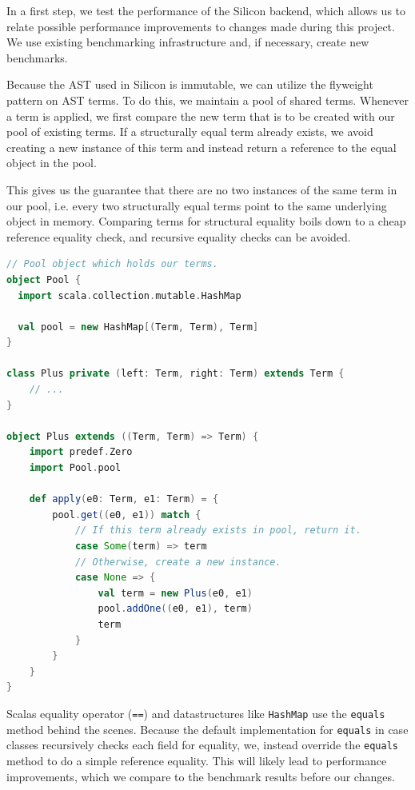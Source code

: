 \documentclass[11pt]{article}
\begin{document}
    In a first step, we test the performance of the Silicon backend,
    which allows us to relate possible performance improvements to 
    changes made during this project. We use existing benchmarking infrastructure 
    and, if necessary, create new benchmarks.

    Because the AST used in Silicon is immutable, we can utilize the flyweight pattern \cite{patterns} on AST terms.
    To do this, we maintain a pool of shared terms. Whenever a term
    is applied, we first compare the new term that is to be created with our
    pool of existing terms. If a structurally equal term already exists, we
    avoid creating a new instance of this term and instead return a reference to the
    equal object in the pool.

    This gives us the guarantee that there are no two instances of the
    same term in our pool, i.e. every two structurally equal terms point to the same
    underlying object in memory. Comparing terms for structural equality boils
    down to a cheap reference equality check, and recursive equality checks can be avoided.

    \begin{lstlisting}[language=Scala, caption=Avoid instantiating multiple structurally equal terms using the flyweight pattern.]
// Pool object which holds our terms.
object Pool {
  import scala.collection.mutable.HashMap

  val pool = new HashMap[(Term, Term), Term]
}

class Plus private (left: Term, right: Term) extends Term {
    // ...
}

object Plus extends ((Term, Term) => Term) {
    import predef.Zero
    import Pool.pool

    def apply(e0: Term, e1: Term) = {
        pool.get((e0, e1)) match {
            // If this term already exists in pool, return it. 
            case Some(term) => term
            // Otherwise, create a new instance.
            case None => {
                val term = new Plus(e0, e1)
                pool.addOne((e0, e1), term)
                term
            }
        }
    }
}
    \end{lstlisting}

    Scalas equality operator (\texttt{==}) and datastructures like \texttt{HashMap}
    use the \texttt{equals} method behind the scenes.
    Because the default implementation for \texttt{equals} in case classes recursively checks each field for equality,
    we, instead override the \texttt{equals} method to do a simple reference equality.
    This will likely lead to performance improvements, which we compare to the benchmark
    results before our changes.
\end{document}
